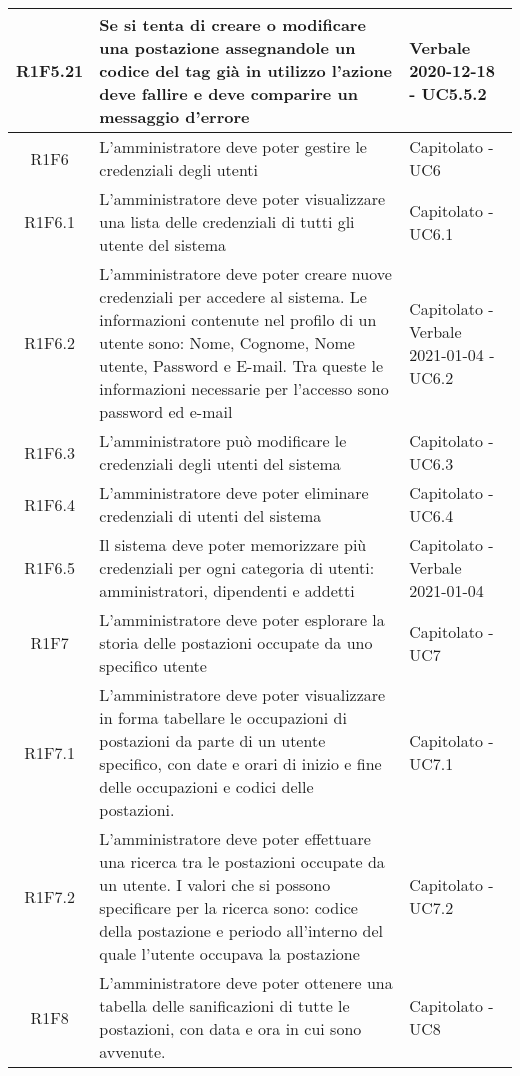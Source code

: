 \begin{center}
\begin{longtable}{|c|p{10cm}|p{4cm}|}
						\hline
			R1F5.21&Se si tenta di creare o modificare una postazione assegnandole un codice del tag già in utilizzo l'azione deve fallire e deve comparire un messaggio d'errore	&Verbale 2020-12-18 - UC5.5.2 	\\
					\hline
			R1F6&L'amministratore deve poter gestire le credenziali degli utenti	& Capitolato - UC6		\\
					\hline
R1F6.1&L'amministratore deve poter visualizzare una lista delle credenziali di tutti gli utente del sistema	& Capitolato - UC6.1	\\
					\hline
R1F6.2&L'amministratore deve poter creare nuove credenziali per accedere al sistema. Le informazioni contenute nel profilo di un utente sono: Nome, Cognome, Nome utente, Password e E-mail. Tra queste le informazioni necessarie per l'accesso sono password ed e-mail	& Capitolato - Verbale 2021-01-04 - UC6.2	\\
						\hline
			R1F6.3&L'amministratore può modificare le credenziali degli utenti del sistema	&Capitolato - UC6.3 	\\
					\hline
			R1F6.4&L'amministratore deve poter eliminare credenziali di utenti del sistema	& Capitolato - UC6.4	\\
					\hline
R1F6.5&Il sistema deve poter memorizzare più credenziali per ogni categoria di utenti: amministratori, dipendenti e addetti	& Capitolato - Verbale 2021-01-04	\\
					\hline
R1F7&L'amministratore deve poter esplorare la storia delle postazioni occupate da uno specifico utente	& Capitolato - UC7	\\
						\hline
			R1F7.1&L'amministratore deve poter visualizzare in forma tabellare le occupazioni di postazioni da parte di un utente specifico, con date e orari di inizio e fine delle occupazioni e codici delle postazioni.	&Capitolato - UC7.1 	\\
					\hline
			R1F7.2&L'amministratore deve poter effettuare una ricerca tra le postazioni occupate da un utente. I valori che si possono specificare per la ricerca sono: codice della postazione e periodo all'interno del quale l'utente occupava la postazione	& 	Capitolato - UC7.2\\
					\hline
R1F8&L'amministratore deve poter ottenere una tabella delle sanificazioni di tutte le postazioni, con data e ora in cui sono avvenute.	&Capitolato - UC8 	\\
					

\end{longtable}
\end{center}
